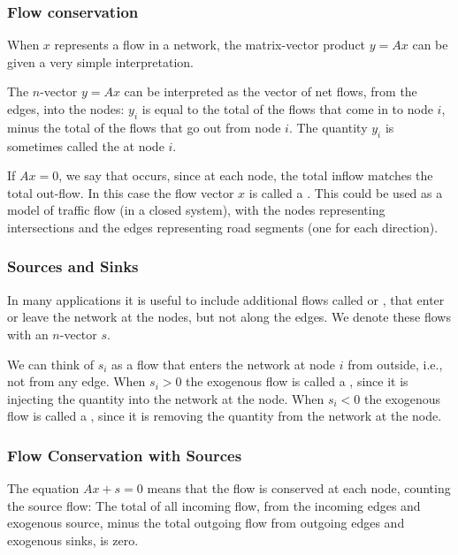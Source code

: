 \subsubsection{Flow conservation}

When $ x $ represents a flow in a network, the matrix-vector product $ y=A x $ can be given a very simple interpretation. 

The $ n $-vector $ y=A x $ can be interpreted as the vector of net flows, from the edges, into the nodes: $ y_{i} $ is equal to the total of the flows that come in to node $ i $, minus the total of the flows that go out from node $ i $. The quantity $ y_{i} $ is sometimes called the  at node $ i $.

If $ A x=0 $, we say that  occurs, since at each node, the total inflow matches the total out-flow. In this case the flow vector $ x $ is called a . This could be used as a model of traffic flow (in a closed system), with the nodes representing intersections and the edges representing road segments (one for each
direction).

\subsubsection{Sources and Sinks}

In many applications it is useful to include additional flows called  or , that enter or leave the network at the nodes, but not along the edges. We denote these flows with an $ n $-vector $ s $. 

We can think of $ s_{i} $ as a flow that enters the network at node $ i $ from outside, i.e., not from any edge. When $ s_{i}>0 $ the exogenous flow is called a , since it is injecting the quantity into the network at the node. When $ s_{i}<0 $ the exogenous flow is called a , since it is removing the quantity from the network at the node.

\subsubsection{Flow Conservation with Sources}

The equation $Ax + s = 0$ means that the flow
is conserved at each node, counting the source flow: The total of all incoming flow,
from the incoming edges and exogenous source, minus the total outgoing flow from
outgoing edges and exogenous sinks, is zero.


